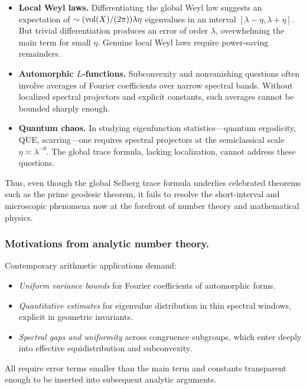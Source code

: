 \begin{itemize}
  \item \textbf{Local Weyl laws.}  
  Differentiating the global Weyl law suggests an expectation of
  $\sim (\operatorname{vol}(X)/(2\pi))\lambda\eta$ eigenvalues in an interval $[\lambda-\eta,\lambda+\eta]$.
  But trivial differentiation produces an error of order $\lambda$, overwhelming
  the main term for small $\eta$. Genuine local Weyl laws require power-saving
  remainders.

  \item \textbf{Automorphic $L$-functions.}  
  Subconvexity and nonvanishing questions often involve averages of Fourier
  coefficients over narrow spectral bands. Without localized spectral projectors
  and explicit constants, such averages cannot be bounded sharply enough.

  \item \textbf{Quantum chaos.}  
  In studying eigenfunction statistics—quantum ergodicity, QUE, scarring—one
  requires spectral projectors at the semiclassical scale $\eta\asymp\lambda^{-\theta}$.
  The global trace formula, lacking localization, cannot address these questions.
\end{itemize}

Thus, even though the global Selberg trace formula underlies celebrated theorems
such as the prime geodesic theorem, it fails to resolve the short-interval and
microscopic phenomena now at the forefront of number theory and mathematical physics.

\subsubsection*{Motivations from analytic number theory.}
Contemporary arithmetic applications demand:
\begin{itemize}
  \item \emph{Uniform variance bounds} for Fourier coefficients of automorphic forms.
  \item \emph{Quantitative estimates} for eigenvalue distribution in thin spectral
  windows, explicit in geometric invariants.
  \item \emph{Spectral gaps and uniformity} across congruence subgroups, which
  enter deeply into effective equidistribution and subconvexity.
\end{itemize}
All require error terms smaller than the main term and constants transparent enough
to be inserted into subsequent analytic arguments.

